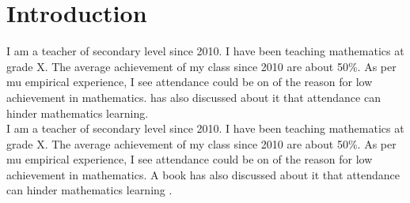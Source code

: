 \documentclass{book}
\begin{document}
\section{Introduction}
I am a teacher of secondary level since 2010. I have been teaching mathematics at grade X. The average achievement of my class since 2010 are about 50\%. As per mu empirical experience, I see attendance could be on of the reason for low achievement in mathematics.  has also discussed about it that attendance can hinder mathematics learning. \\


\noindent I am a teacher of secondary level since 2010. I have been teaching mathematics at grade X. The average achievement of my class since 2010 are about 50\%. As per mu empirical experience, I see attendance could be on of the reason for low achievement in mathematics. A book has also discussed about it that attendance can hinder mathematics learning \cite{hpu}. 




\end{document}
